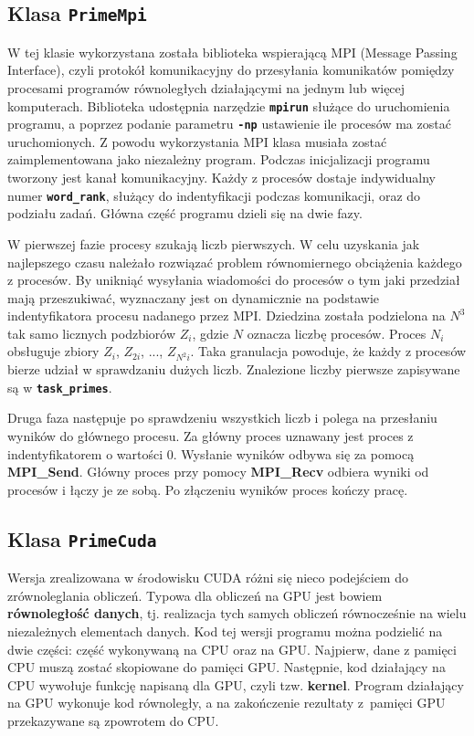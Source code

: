\documentclass[12pt, twoside, hidelinks, a4paper]{article}
\begin{document}
\subsection{Klasa \textbf{\texttt{PrimeMpi}}}
W tej klasie wykorzystana została biblioteka wspierającą MPI (Message Passing Interface), czyli protokół komunikacyjny do przesyłania komunikatów pomiędzy procesami programów równoległych działającymi na jednym lub więcej komputerach.  Biblioteka udostępnia narzędzie \textbf{\texttt{mpirun}} służące do uruchomienia programu, a poprzez podanie parametru \textbf{\texttt{-np}} ustawienie ile procesów ma zostać uruchomionych. Z powodu wykorzystania MPI klasa musiała zostać zaimplementowana jako niezależny program. Podczas inicjalizacji programu tworzony jest kanał komunikacyjny. Każdy z procesów dostaje indywidualny numer \textbf{\texttt{word\_rank}}, służący do indentyfikacji podczas komunikacji, oraz do podziału zadań. Główna część programu dzieli się na dwie fazy.

W pierwszej fazie procesy szukają liczb pierwszych. W celu uzyskania jak najlepszego czasu należało rozwiązać problem równomiernego obciążenia każdego z procesów. By unikniąć wysyłania wiadomości do procesów o tym jaki przedział mają przeszukiwać, wyznaczany jest on dynamicznie na podstawie indentyfikatora procesu nadanego przez MPI. Dziedzina została podzielona na $N^3$ tak samo licznych podzbiorów $Z_i$, gdzie $N$ oznacza liczbę procesów. Proces $N_i$ obsługuje zbiory $Z_i$, $Z_{2i}$, ..., $Z_{N^2i}$. Taka granulacja powoduje, że każdy z procesów bierze udział w sprawdzaniu dużych liczb. Znalezione liczby pierwsze zapisywane są w \textbf{\texttt{task\_primes}}.

Druga faza następuje po sprawdzeniu wszystkich liczb i polega na przesłaniu wyników do głównego procesu. Za główny proces uznawany jest proces z indentyfikatorem o wartości $0$. Wysłanie wyników odbywa się za pomocą \textbf{MPI\_Send}. Główny proces przy pomocy \textbf{MPI\_Recv} odbiera wyniki od procesów i łączy je ze sobą. Po złączeniu wyników proces kończy pracę.      

\subsection{Klasa \textbf{\texttt{PrimeCuda}}}
Wersja zrealizowana w środowisku CUDA różni się nieco podejściem do zrównoleglania obliczeń. Typowa dla obliczeń na GPU jest bowiem \textbf{równoległość danych}, tj. realizacja tych samych obliczeń równocześnie na wielu niezależnych elementach danych.
Kod tej wersji programu można podzielić na dwie części: część wykonywaną na CPU oraz na GPU. Najpierw, dane z pamięci CPU muszą zostać skopiowane do pamięci GPU. Następnie, kod działający na CPU wywołuje funkcję napisaną dla GPU, czyli tzw. \textbf{kernel}. Program działający na GPU wykonuje kod równoległy, a na zakończenie rezultaty z~pamięci GPU przekazywane są zpowrotem do CPU.
\end{document}
